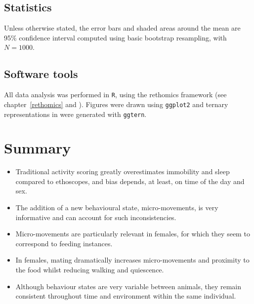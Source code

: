 \subsection{Statistics}
Unless otherwise stated, the error bars and shaded areas around the mean are 95\% confidence interval computed using basic bootstrap resampling\cite{efron_bootstrap_1992}, with $N=1000$.

\subsection{Software tools}
All data analysis was performed in \texttt{R}\cite{r_core_team_r_2017}, using the rethomics framework (see chapter~\ref{rethomics} and \cite{geissmann_rethomics_2018}).
Figures were drawn using \texttt{ggplot2} \cite{wickham_ggplot2_2016} and ternary representations in were generated with \texttt{ggtern}\cite{hamilton_ggtern_2017}.
\newpage
\section{Summary}

\begin{itemize}
\item Traditional activity scoring greatly overestimates immobility and sleep compared to ethoscopes, and bias depends, at least, on time of the day and sex.
\item The addition of a new behavioural state, micro-movements, is very informative and can account for such inconsistencies.
\item Micro-movements are particularly relevant in females, for which they seem to correspond to feeding instances.
\item In females, mating dramatically increases micro-movements and proximity to the food whilst reducing walking and quiescence.
\item Although behaviour states are very variable between animals, they remain consistent throughout time and environment within the same individual.

\end{itemize}


